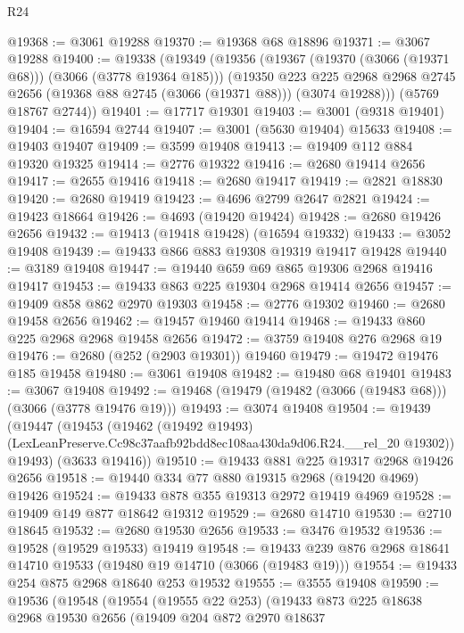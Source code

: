 \begin{lexlean}{R24}
\begin{coremodule}
@19368 := @3061 @19288
@19370 := @19368 @68 @18896
@19371 := @3067 @19288
@19400 := @19338
    (@19349
      (@19356
        (@19367 (@19370 (@3066 (@19371 @68))) (@3066 (@3778 @19364 @185)))
        (@19350
          @223
          @225
          @2968
          @2968
          @2745
          @2656
          (@19368 @88 @2745 (@3066 (@19371 @88)))
          (@3074 @19288)))
      (@5769 @18767 @2744))
@19401 := @17717 @19301
@19403 := @3001 (@9318 @19401)
@19404 := @16594 @2744
@19407 := @3001 (@5630 @19404) @15633
@19408 := @19403 @19407
@19409 := @3599 @19408
@19413 := @19409 @112 @884 @19320 @19325
@19414 := @2776 @19322
@19416 := @2680 @19414 @2656
@19417 := @2655 @19416
@19418 := @2680 @19417
@19419 := @2821 @18830
@19420 := @2680 @19419
@19423 := @4696 @2799 @2647 @2821
@19424 := @19423 @18664
@19426 := @4693 (@19420 @19424)
@19428 := @2680 @19426 @2656
@19432 := @19413 (@19418 @19428) (@16594 @19332)
@19433 := @3052 @19408
@19439 := @19433 @866 @883 @19308 @19319 @19417 @19428
@19440 := @3189 @19408
@19447 := @19440 @659 @69 @865 @19306 @2968 @19416 @19417
@19453 := @19433 @863 @225 @19304 @2968 @19414 @2656
@19457 := @19409 @858 @862 @2970 @19303
@19458 := @2776 @19302
@19460 := @2680 @19458 @2656
@19462 := @19457 @19460 @19414
@19468 := @19433 @860 @225 @2968 @2968 @19458 @2656
@19472 := @3759 @19408 @276 @2968 @19
@19476 := @2680 (@252 (@2903 @19301)) @19460
@19479 := @19472 @19476 @185 @19458
@19480 := @3061 @19408
@19482 := @19480 @68 @19401
@19483 := @3067 @19408
@19492 := @19468 (@19479 (@19482 (@3066 (@19483 @68))) (@3066 (@3778 @19476 @19)))
@19493 := @3074 @19408
@19504 := @19439
    (@19447
      (@19453
        (@19462
          (@19492 @19493)
          (LexLeanPreserve.Cc98c37aafb92bdd8ec108aa430da9d06.R24.__rel_20 @19302))
        @19493)
      (@3633 @19416))
@19510 := @19433 @881 @225 @19317 @2968 @19426 @2656
@19518 := @19440 @334 @77 @880 @19315 @2968 (@19420 @4969) @19426
@19524 := @19433 @878 @355 @19313 @2972 @19419 @4969
@19528 := @19409 @149 @877 @18642 @19312
@19529 := @2680 @14710
@19530 := @2710 @18645
@19532 := @2680 @19530 @2656
@19533 := @3476 @19532
@19536 := @19528 (@19529 @19533) @19419
@19548 := @19433 @239 @876 @2968 @18641 @14710 @19533 (@19480 @19 @14710 (@3066 (@19483 @19)))
@19554 := @19433 @254 @875 @2968 @18640 @253 @19532
@19555 := @3555 @19408
@19590 := @19536
    (@19548
      (@19554
        (@19555 @22 @253)
        (@19433
          @873
          @225
          @18638
          @2968
          @19530
          @2656
          (@19409
            @204
            @872
            @2970
            @18637

\end{coremodule}
\end{lexlean}
